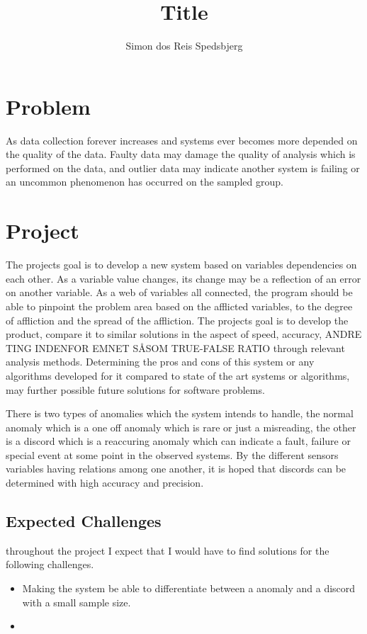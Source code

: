 \documentclass[a4paper,8pt]{article}
\title{Title}
\author{Simon dos Reis Spedsbjerg}
\begin{document}
	\maketitle
	
	\section{Problem}
	As data collection forever increases and systems ever becomes more depended on the quality of the data. Faulty data may damage the quality of analysis which is performed on the data, and outlier data may indicate another system is failing or an uncommon phenomenon has occurred on the sampled group.
	
	\section{Project}
	The projects goal is to develop a new system based on variables dependencies on each other. As a variable value changes, its change may be a reflection of an error on another variable. As a web of variables all connected, the program should be able to pinpoint the problem area based on the afflicted variables, to the degree of affliction and the spread of the affliction. The projects goal is to develop the product, compare it to similar solutions in the aspect of speed, accuracy, ANDRE TING INDENFOR EMNET SÅSOM TRUE-FALSE RATIO through relevant analysis methods. Determining the pros and cons of this system or any algorithms developed for it compared to state of the art systems or algorithms, may further possible future solutions for software problems.
	
	There is two types of anomalies which the system intends to handle, the normal anomaly which is a one off anomaly which is rare or just a misreading, the other is a discord which is a reaccuring anomaly which can indicate a fault, failure or special event at some point in the observed systems. By the different sensors variables having relations among one another, it is hoped that discords can be determined with high accuracy and precision.
	
	\subsection{Expected Challenges}
		throughout the project I expect that I would have to find solutions for the following challenges.
		\begin{itemize}
			\item Making the system be able to differentiate between a anomaly and a discord with a small sample size.
			\item 
		\end{itemize}
	
\end{document}
